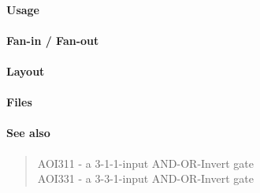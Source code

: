 \paragraph{Usage}

\paragraph{Fan-in / Fan-out}

\paragraph{Layout}

\paragraph{Files}

\paragraph{See also}
\begin{quote}
    AOI311 - a 3-1-1-input AND-OR-Invert gate \\
    AOI331 - a 3-3-1-input AND-OR-Invert gate
\end{quote}
